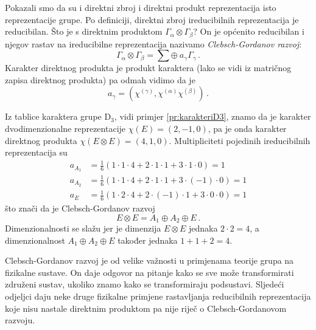 Pokazali smo da su i direktni zbroj i direktni produkt reprezentacija
isto reprezentacije grupe. Po definiciji, direktni zbroj ireducibilnih
reprezentacija je reducibilan.
Što je s direktnim produktom  $\Gamma_{\alpha} \otimes \Gamma_{\beta}$?
On je općenito reducibilan i njegov rastav na ireducibilne reprezentacija
nazivamo \emph{Clebsch-Gordanov razvoj}:
\begin{displaymath}
  \Gamma_{\alpha}\otimes\Gamma_{\beta} =
  \sum \oplus\: a_{\gamma}\Gamma_{\gamma}  \,.
\end{displaymath}
Karakter direktnog produkta je produkt karaktera (lako se vidi iz
matričnog zapisa direktnog produkta) pa odmah vidimo da je
\begin{displaymath}
a_{\gamma}  = (\chi^{(\gamma)}, \chi^{(\alpha)}\chi^{(\beta)}) \,.
\end{displaymath}

\begin{primjer}
Iz tablice karaktera grupe D$_3$, vidi primjer \ref{pr:karakteriD3}, znamo
da je karakter dvodimenzionalne reprezentacije $\chi(E)=(2, -1, 0)$,
pa je onda karakter direktnog produkta
$ \chi(E\otimes E)=(4, 1, 0)$.
Multipliciteti pojedinih ireducibilnih reprezentacija su
\begin{align*}
    a_{A_1}& =\frac{1}{6}(1\cdot 1\cdot 4+2\cdot 1\cdot 1+3\cdot 1\cdot 0)=1 \\
    a_{A_2}& =\frac{1}{6}(1\cdot 1\cdot 4+2\cdot 1\cdot 1+3\cdot (-1)\cdot 0)=1 \\
    a_{E}& =\frac{1}{6}(1\cdot 2\cdot 4+2\cdot (-1)\cdot 1+3\cdot 0\cdot 0)=1
\end{align*}
što znači da je Clebsch-Gordanov razvoj
\begin{equation}
E\otimes E = A_1 \oplus A_2 \oplus E  \,.
\end{equation}
Dimenzionalnosti se slažu jer je dimenzija $E\otimes E$ jednaka $2\cdot 2=4$, a dimenzionalnost
$A_1 \oplus A_2 \oplus E$ također jednaka $1+1+2=4$.
\end{primjer}

Clebsch-Gordanov razvoj je od velike važnosti u primjenama teorije
grupa na fizikalne sustave. On  daje odgovor na pitanje
kako se sve može transformirati združeni sustav, ukoliko znamo kako
se transformiraju podsustavi. Sljedeći odjeljci daju neke druge fizikalne
primjene rastavljanja reducibilnih reprezentacija koje nisu nastale
direktnim produktom pa nije riječ o Clebsch-Gordanovom razvoju.

